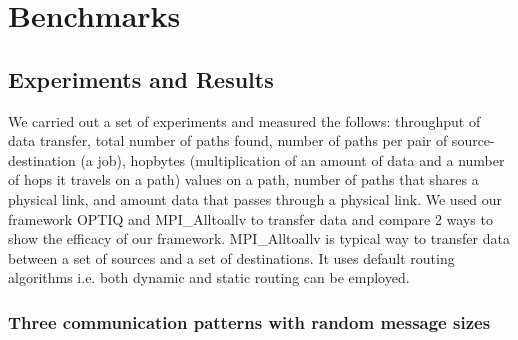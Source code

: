 \section{Benchmarks}
\label{sec:benchmark}





%



\subsection{Experiments and Results}

We carried out a set of experiments and measured the follows: throughput of data transfer, total number of paths found, number of paths per pair of source-destination (a job), hopbytes (multiplication of an amount of data and a number of hops it travels on a path) values on a path, number of paths that shares a physical link, and amount data that passes through a physical link. We used our framework OPTIQ and MPI\_Alltoallv to transfer data and compare 2 ways to show the efficacy of our framework. MPI\_Alltoallv is typical way to transfer data between a set of sources and a set of destinations. It uses default routing algorithms i.e. both dynamic and static routing can be employed.



\subsubsection {Three communication patterns with random message sizes}


%
